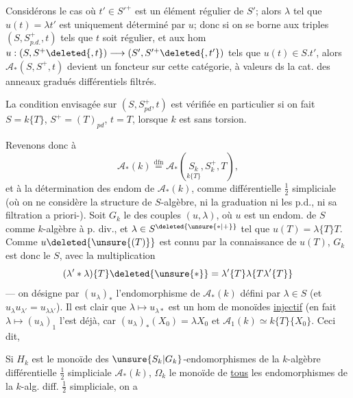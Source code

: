 Considérons le cas où $t'\in S'^+$ est un élément régulier de $S'$; alors $\lambda$ tel que $u(t)=\lambda t'$ est uniquement déterminé par $u$; donc si on se borne aux triples $(S,S^+_{p.d.},t)$ tels que $t$ soit régulier, et aux hom $u:(S,S^+\deleted{,t})\longrightarrow(S',S'^+\deleted{,t'})$ tels que $u(t)\in S.t'$, alors $\mathcal A_*(S,S^+,t)$ devient un foncteur sur cette catégorie, à valeurs ds la cat. des  anneaux gradués   différentiels filtrés.

La condition envisagée sur $(S,S^+_{pd},t)$ est vérifiée en particulier si on fait $S=k\{T\}$, $S^+=(T)_{pd}$, $t=T$, lorsque $k$ est sans torsion.

Revenons donc à
\[
\mathcal A_*(k)\overset{\mathrm{dfn}}=\mathcal A_*(\underset{k\{T\}}{S_k},S_k^+,T),
\]
et à la détermination des endom de $\mathcal A_*(k)$, comme   différentielle $\frac12$ simpliciale (où on ne considère  la structure de $S$-algèbre, ni la graduation ni les p.d., ni sa filtration a priori-). 
Soit $G_k$ le   des couples $(u,\lambda)$, où $u$ est un endom. de $S$ comme $k$-algèbre à p. div., et $\lambda\in S^{\deleted{\unsure{*|+}}}$ tel que $u(T)=\lambda\{T\}T$. Comme $u\deleted{\unsure{(T)}}$ est connu par la connaissance de $u(T)$, $G_k$ est donc le    $S$, avec la multiplication
\[
(\lambda'*\lambda)\{T\}\deleted{\unsure{*}}=\lambda'\{T\}\lambda\{T\lambda'\{T\}\}
\]
 --- on désigne par $(u_\lambda)_*$ l'endomorphisme de $\mathcal A_*(k)$ défini par $\lambda\in S$ (et $u_\lambda u_{\lambda'}=u_{\lambda\lambda'}$).
Il est clair que $\lambda\longmapsto u_{\lambda*}$ est un hom de monoïdes \uline{injectif} (en fait $\lambda\longmapsto(u_\lambda)_1$ l'est déjà, car $(u_\lambda)_*(X_0)=\lambda X_0$ et $\mathcal A_1(k)\simeq k\{T\}\{X_0\}$.
Ceci dit,

Si $H_k$ est le monoïde des $\unsure{S_k|G_k}$-endomorphismes de la $k$-algèbre différentielle $\frac12$ simpliciale $\mathcal A_*(k)$,   $\Omega_k$ le monoïde de \uline{tous} les endomorphismes de la $k$-alg. diff. $\frac12$ simpliciale, on a
